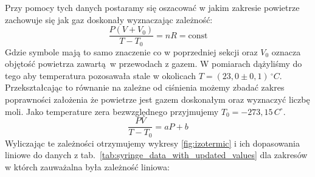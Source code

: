 \documentclass[12pt]{article}
\begin{document}
Przy pomocy tych danych postaramy się oszacować w jakim zakresie powietrze zachowuje się jak gaz doskonały wyznaczając zależność:
\[
    \frac{P(V + V_0)}{T - T_0} = nR = \text{const}
\]
Gdzie symbole mają to samo znaczenie co w poprzedniej sekcji oraz \(V_0\) oznacza objętość powietrza zawartą w przewodach z gazem. W pomiarach dążyliśmy do tego aby temperatura pozosawała stale w okolicach \(T = (23{,}0 \pm 0{,}1) \, ^\circ C\). Przekształcając to równanie na zależne od ciśnienia możemy zbadać zakres poprawności założenia że powietrze jest gazem doskonałym oraz wyznaczyć liczbę moli. Jako temperature zera bezwzględnego\cite{zero} przyjmujemy \(T_0 = -273{,}15\,C^\circ\).
\[
    \frac{PV}{T - T_0} = aP + b
\]
Wyliczając te zależności otrzymujemy wykresy \ref{fig:izotermic} i ich dopasowania liniowe do danych z tab.~\ref{tab:syringe_data_with_updated_values} dla zakresów w którch zauważalna była zależność liniowa:
\end{document}
